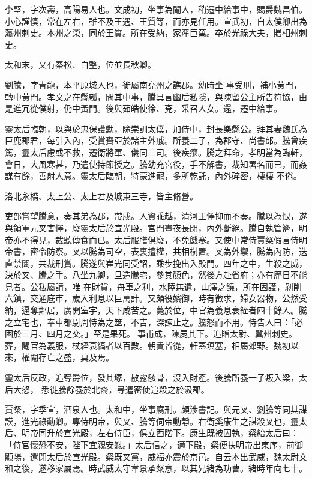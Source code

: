 \begin{pinyinscope}
 李堅，字次壽，高陽易人也。文成初，坐事為閹人，稍遷中給事中，賜爵魏昌伯。小心謹慎，常在左右，雖不及王遇、王質等，而亦見任用。宣武初，自太僕卿出為瀛州刺史。本州之榮，同於王質。所在受納，家產巨萬。卒於光祿大夫，贈相州刺史。



 太和末，又有秦松、白整，位並長秋卿。



 劉騰，字青龍，本平原城人也，徙屬南兗州之譙郡。幼時坐
 事受刑，補小黃門，轉中黃門。孝文之在縣瓠，問其中事，騰具言幽后私隱，與陳留公主所告符協，由是進冗從僕射，仍中黃門。後與茹皓使徐、兗，采召人女。還，遷中給事。



 靈太后臨朝，以與於忠保護勳，除崇訓太僕，加侍中，封長樂縣公。拜其妻魏氏為巨鹿郡君，每引入內，受賞賚亞於諸主外戚。所養二子，為郡守、尚書郎。騰曾疾篤，靈太后慮或不救，遷衛將軍、儀同三司。後疾瘳。騰之拜命，孝明當為臨軒，會日，大風寒甚，乃遣使持節授之。騰幼充宮役，手不解書，裁知署名而已，而姦謀有餘，善射人意。靈太后臨朝，特蒙進寵，多所乾託，內外碎密，棲棲
 不倦。



 洛北永橋、太上公、太上君及城東三寺，皆主脩營。



 吏部嘗望騰意，奏其弟為郡，帶戍。人資乖越，清河王懌抑而不奏。騰以為恨，遂與領軍元叉害懌，廢靈太后於宣光殿。宮門晝夜長閉，內外斷絕。騰自執管籥，明帝亦不得見，裁聽傳食而已。太后服膳俱廢，不免饑寒。又使中常侍賈粲假言侍明帝書，密令防察。叉以騰為司空，表裏擅權，共相樹置。叉為外禦，騰為內防，迭直禁闥，共裁刑賞。騰遂與崔光同受詔，乘步挽出入殿門。四年之中，生殺之威，決於叉、騰之手。八坐九卿，旦造騰宅，參其顏色，然後方赴省府；亦有歷日不能見者。公私屬請，唯
 在財貨，舟車之利，水陸無遺，山澤之饒，所在固護，剝削六鎮，交通底市，歲入利息以巨萬計。又頗役嬪御，時有徵求，婦女器物，公然受納，逼奪鄰居，廣開室宇，天下咸苦之。薨於位，中官為義息衰絰者四十餘人。騰之立宅也，奉車都尉周恃為之筮，不吉，深諫止之。騰怒而不用。恃告人曰：「必困於三月、四月之交。」至是果死。事甫成，陳屍其下。追贈太尉、冀州刺史。葬，閹官為義服，杖絰衰縞者以百數。朝貴皆從，軒蓋填塞，相屬郊野。魏初以來，權閹存亡之盛，莫及焉。



 靈太后反政，追奪爵位，發其塚，散露骸骨，沒入財產。後騰所養一子叛入梁，太后大怒，
 悉徙騰餘養於北裔，尋遣密使追殺之於汲郡。



 賈粲，字季宣，酒泉人也。太和中，坐事腐刑。頗涉書記。與元叉、劉騰等同其謀謨，進光祿勳卿。專侍明帝，與叉、騰等伺帝動靜。右衛奚康生之謀殺叉也，靈太后、明帝同升於宣光殿，左右侍臣，俱立西階下。康生既被囚執，粲紿太后曰：「侍官懷恐不安，陛下宜親安慰。」太后信之，適下殿，粲便扶明帝出東序，前御顯陽，還閉太后於宣光殿。粲既叉黨，威福亦震於京邑。自云本出武威，魏太尉文和之後，遂移家屬焉。時武威太守韋景承粲意，以其兄緒為功曹。緒時年向七十。




\end{pinyinscope}
